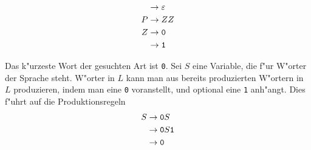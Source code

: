 \begin{loesung}
\begin{teilaufgaben}
\begin{align*}
 &\rightarrow \varepsilon\\
P&\rightarrow ZZ\\
Z&\rightarrow {\tt 0}\\
 &\rightarrow {\tt 1}
\end{align*}
\item
Das k"urzeste Wort der gesuchten Art ist {\tt 0}. Sei $S$ eine
Variable, die f"ur W"orter der Sprache steht. W"orter in $L$
kann man aus bereits produzierten W"ortern in $L$ produzieren,
indem man  eine {\tt 0} voranstellt, und optional eine {\tt 1}
anh"angt. Dies f"uhrt auf die Produktionsregeln
\begin{align*}
S&\rightarrow {\tt 0}S\\
 &\rightarrow {\tt 0}S{\tt 1}\\
 &\rightarrow {\tt 0}
\end{align*}
\end{teilaufgaben}
\end{loesung}
